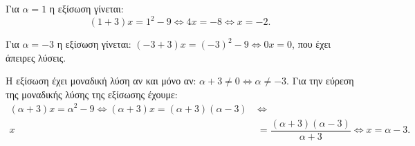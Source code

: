 
\begin{alist}
\item 
\begin{rlist}
\item Για $\alpha = 1$ η εξίσωση γίνεται:
\[(1 + 3)x = 1^2 - 9 \Leftrightarrow 4x = -8 \Leftrightarrow x = -2.\]

\item Για $\alpha = -3$ η εξίσωση γίνεται:
$(-3 + 3)x = (-3)^2 - 9 \Leftrightarrow 0x = 0$, που έχει άπειρες λύσεις.
\end{rlist}

\item Η εξίσωση έχει μοναδική λύση αν και μόνο αν: $\alpha + 3 \ne 0 \Leftrightarrow \alpha \ne -3$.
Για την εύρεση της μοναδικής λύσης της εξίσωσης έχουμε:
\begin{align*}
(\alpha + 3)x = \alpha^2 - 9 \Leftrightarrow (\alpha + 3)x = (\alpha + 3)(\alpha - 3) \ &\Leftrightarrow \\
x &= \dfrac{(\alpha + 3)(\alpha - 3)}{\alpha + 3} \Leftrightarrow x = \alpha - 3.
\end{align*}
\end{alist}

